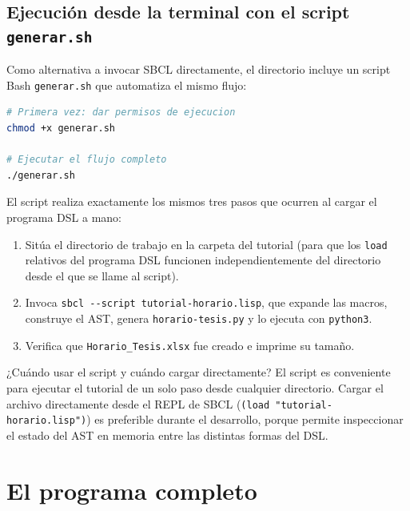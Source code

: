 \documentclass[12pt,a4paper]{report}
\begin{document}
\subsection{Ejecución desde la terminal con el script \texttt{generar.sh}}

Como alternativa a invocar SBCL directamente, el directorio incluye un
script Bash \texttt{generar.sh} que automatiza el mismo flujo:

\begin{lstlisting}[language=bash, numbers=none, backgroundcolor=\color{gray!10},
                   basicstyle=\ttfamily\small, keywordstyle={}]
# Primera vez: dar permisos de ejecucion
chmod +x generar.sh

# Ejecutar el flujo completo
./generar.sh
\end{lstlisting}

El script realiza exactamente los mismos tres pasos que ocurren al cargar
el programa DSL a mano:

\begin{enumerate}
  \item Sitúa el directorio de trabajo en la carpeta del tutorial (para que
        los \texttt{load} relativos del programa DSL funcionen
        independientemente del directorio desde el que se llame al script).
  \item Invoca \texttt{sbcl -{}-script tutorial-horario.lisp}, que expande
        las macros, construye el AST, genera \texttt{horario-tesis.py} y lo
        ejecuta con \texttt{python3}.
  \item Verifica que \texttt{Horario\_Tesis.xlsx} fue creado e imprime su
        tamaño.
\end{enumerate}

\begin{infobox}{¿Cuándo usar el script y cuándo cargar directamente?}
El script es conveniente para ejecutar el tutorial de un solo paso desde
cualquier directorio.  Cargar el archivo directamente desde el REPL de
SBCL (\texttt{(load "tutorial-horario.lisp")}) es preferible durante el
desarrollo, porque permite inspeccionar el estado del AST en memoria entre
las distintas formas del DSL.
\end{infobox}

\section{El programa completo}
\label{sec:completo}
\end{document}
